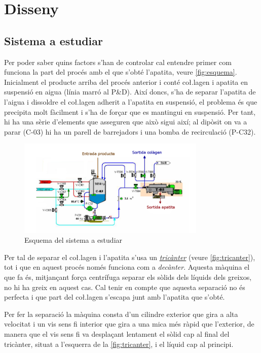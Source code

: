 \documentclass[a4paper]{article}
\begin{document}
\section{Disseny}

\subsection{Sistema a estudiar}
Per poder saber quins factors s'han de controlar cal entendre primer com funciona la part del procés amb el que s'obté l'apatita, veure \autoref{fig:esquema}. Inicialment el producte arriba del procés anterior i conté co\l.lagen i apatita en suspensió en aigua (línia marró al P\&D). Així doncs, s'ha de separar l'apatita de l'aigua i dissoldre el co\l.lagen adherit a l'apatita en suspensió, el problema és que precipita molt fàcilment i s'ha de forçar que es mantingui en suspensió. Per tant, hi ha una sèrie d'elements que asseguren que això sigui així; al dipòsit on va a parar (C-03) hi ha un parell de barrejadors i una bomba de recirculació (P-C32). 

\begin{figure}[H]
	\centering
	\includegraphics[width=0.8\textwidth]{images/esquema}
	\caption{Esquema del sistema a estudiar}
	\label{fig:esquema}
\end{figure}

Per tal de separar el co\l.lagen i l'apatita s'usa un \emph{\href{https://youtu.be/uvWcLZWM_JY}{tricànter}} (veure \autoref{fig:tricanter}), tot i que en aquest procés només funciona com a \emph{decànter}. Aquesta màquina el que fa és, mitjançant força centrífuga separar els sòlids dels líquids dels greixos, no hi ha greix en aquest cas. Cal tenir en compte que aquesta separació no és perfecta i que part del co\l.lagen s'escapa junt amb l'apatita que s'obté.

Per fer la separació la màquina consta d'un cilindre exterior que gira a alta velocitat i un vis sens fi interior que gira a una mica més ràpid que l'exterior, de manera que el vis sens fi va desplaçant lentament el sòlid cap al final del tricànter, situat a l'esquerra de la \autoref{fig:tricanter}, i el líquid cap al principi. 
\end{document}
